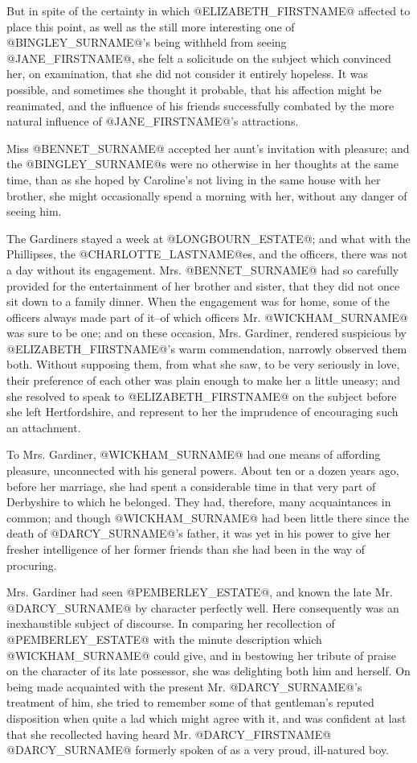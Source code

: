 But in spite of the certainty in which @ELIZABETH_FIRSTNAME@ affected to place this
point, as well as the still more interesting one of @BINGLEY_SURNAME@'s being
withheld from seeing @JANE_FIRSTNAME@, she felt a solicitude on the subject which
convinced her, on examination, that she did not consider it entirely
hopeless. It was possible, and sometimes she thought it probable, that
his affection might be reanimated, and the influence of his friends
successfully combated by the more natural influence of @JANE_FIRSTNAME@'s
attractions.

Miss @BENNET_SURNAME@ accepted her aunt's invitation with pleasure; and the
@BINGLEY_SURNAME@s were no otherwise in her thoughts at the same time, than as she
hoped by Caroline's not living in the same house with her brother,
she might occasionally spend a morning with her, without any danger of
seeing him.

The Gardiners stayed a week at @LONGBOURN_ESTATE@; and what with the Phillipses,
the @CHARLOTTE_LASTNAME@es, and the officers, there was not a day without its
engagement. Mrs. @BENNET_SURNAME@ had so carefully provided for the entertainment
of her brother and sister, that they did not once sit down to a family
dinner. When the engagement was for home, some of the officers always
made part of it--of which officers Mr. @WICKHAM_SURNAME@ was sure to be one; and
on these occasion, Mrs. Gardiner, rendered suspicious by @ELIZABETH_FIRSTNAME@'s
warm commendation, narrowly observed them both. Without supposing them,
from what she saw, to be very seriously in love, their preference
of each other was plain enough to make her a little uneasy; and
she resolved to speak to @ELIZABETH_FIRSTNAME@ on the subject before she left
Hertfordshire, and represent to her the imprudence of encouraging such
an attachment.

To Mrs. Gardiner, @WICKHAM_SURNAME@ had one means of affording pleasure,
unconnected with his general powers. About ten or a dozen years ago,
before her marriage, she had spent a considerable time in that very
part of Derbyshire to which he belonged. They had, therefore, many
acquaintances in common; and though @WICKHAM_SURNAME@ had been little there since
the death of @DARCY_SURNAME@'s father, it was yet in his power to give her fresher
intelligence of her former friends than she had been in the way of
procuring.

Mrs. Gardiner had seen @PEMBERLEY_ESTATE@, and known the late Mr. @DARCY_SURNAME@ by
character perfectly well. Here consequently was an inexhaustible subject
of discourse. In comparing her recollection of @PEMBERLEY_ESTATE@ with the minute
description which @WICKHAM_SURNAME@ could give, and in bestowing her tribute of
praise on the character of its late possessor, she was delighting both
him and herself. On being made acquainted with the present Mr. @DARCY_SURNAME@'s
treatment of him, she tried to remember some of that gentleman's
reputed disposition when quite a lad which might agree with it, and
was confident at last that she recollected having heard Mr. @DARCY_FIRSTNAME@
@DARCY_SURNAME@ formerly spoken of as a very proud, ill-natured boy.



